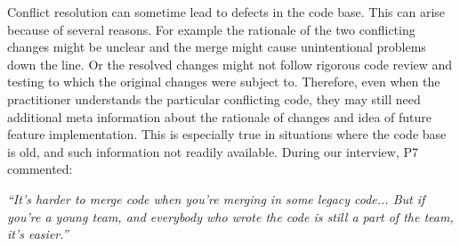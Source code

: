 %

Conflict resolution can sometime lead to defects in the code base. This can arise because of several reasons. For example the rationale of the two conflicting changes might be unclear and the merge might cause unintentional problems down the line. Or the resolved changes might not follow rigorous code review and testing to which the original changes were subject to.
Therefore, even when the practitioner understands the particular conflicting code, they may still need additional meta information about the rationale of changes and idea of future feature implementation. This is especially true in situations where the code base is old, and such information not readily available. During our interview, P7 commented:
\begin{quoting}
\textit{``It's harder to merge code when you're merging in some legacy code... But if you're a young team, and everybody who wrote the code is still a part of the team, it's easier.''}
\end{quoting}

